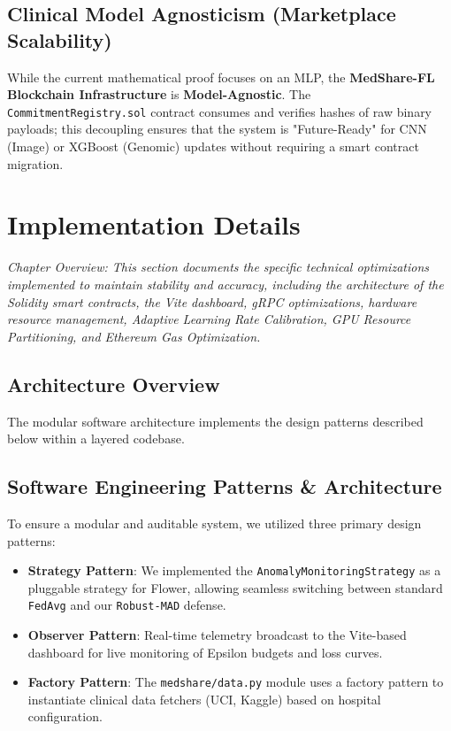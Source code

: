 \documentclass[10pt, a4paper, twocolumn]{article}
\begin{document}
\subsection{Clinical Model Agnosticism (Marketplace Scalability)}
While the current mathematical proof focuses on an MLP, the \textbf{MedShare-FL Blockchain Infrastructure} is \textbf{Model-Agnostic}. The \texttt{CommitmentRegistry.sol} contract consumes and verifies hashes of raw binary payloads; this decoupling ensures that the system is "Future-Ready" for CNN (Image) or XGBoost (Genomic) updates without requiring a smart contract migration.

\section{Implementation Details}
\label{sec:implementation}

\textit{Chapter Overview: This section documents the specific technical optimizations implemented to maintain stability and accuracy, including the architecture of the Solidity smart contracts, the Vite dashboard, gRPC optimizations, hardware resource management, Adaptive Learning Rate Calibration, GPU Resource Partitioning, and Ethereum Gas Optimization.}

\subsection{Architecture Overview}
The modular software architecture implements the design patterns described below within a layered codebase.

\subsection{Software Engineering Patterns \& Architecture}
To ensure a modular and auditable system, we utilized three primary design patterns:
\begin{itemize}
    \item \textbf{Strategy Pattern}: We implemented the \texttt{AnomalyMonitoringStrategy} as a pluggable strategy for Flower, allowing seamless switching between standard \texttt{FedAvg} and our \texttt{Robust-MAD} defense.
    \item \textbf{Observer Pattern}: Real-time telemetry broadcast to the Vite-based dashboard for live monitoring of Epsilon budgets and loss curves.
    \item \textbf{Factory Pattern}: The \texttt{medshare/data.py} module uses a factory pattern to instantiate clinical data fetchers (UCI, Kaggle) based on hospital configuration.
\end{itemize}
\end{document}
